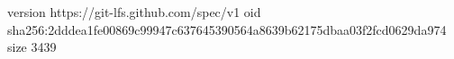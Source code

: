 version https://git-lfs.github.com/spec/v1
oid sha256:2dddea1fe00869c99947c637645390564a8639b62175dbaa03f2fcd0629da974
size 3439
